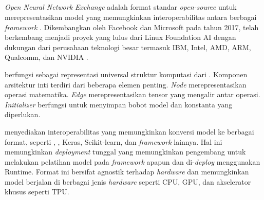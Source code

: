\subsection{\onnx}
\label{subsec:onnx}

\emph{Open Neural Network Exchange} \onnx{} adalah format standar \emph{open-source} untuk merepresentasikan model \ml{} yang memungkinkan interoperabilitas antara berbagai \emph{framework} \dl. Dikembangkan oleh Facebook dan Microsoft pada tahun 2017, \onnx{} telah berkembang menjadi proyek yang lulus dari Linux Foundation AI dengan dukungan dari perusahaan teknologi besar termasuk IBM, Intel, AMD, ARM, Qualcomm, dan NVIDIA \parencite{onnxgithub2019}.

\onnx{} berfungsi sebagai representasi universal struktur komputasi dari \nn. Komponen arsitektur inti \onnx{} terdiri dari beberapa elemen penting. \emph{Node} merepresentasikan operasi matematika. \emph{Edge} merepresentasikan tensor yang mengalir antar operasi. \emph{Initializer} berfungsi untuk menyimpan bobot model dan konstanta yang diperlukan.



\onnx{} menyediakan interoperabilitas yang memungkinkan konversi model ke berbagai format, seperti \pytorch, \tensorflow, Keras, Scikit-learn, dan \emph{framework} lainnya. Hal ini memungkinkan \emph{deployment} tunggal yang memungkinkan pengembang untuk melakukan pelatihan model pada \emph{framework} apapun dan di-\emph{deploy} menggunakan \onnx Runtime. Format ini bersifat agnostik terhadap \emph{hardware} dan memungkinkan model berjalan di berbagai jenis \emph{hardware} seperti CPU, GPU, dan akselerator khusus seperti TPU.

